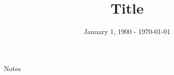 \documentclass[a4paper,11pt]{article}
\author{}
\title{Title}
\date{January 1, 1900 - \today}
\begin{document}
	
	\maketitle
	
	Notes
	
\end{document}
